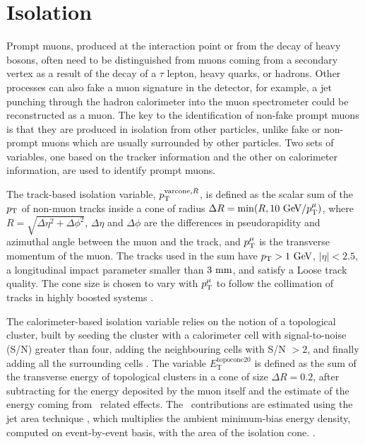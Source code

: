 \section{Isolation}

Prompt muons, produced at the interaction point or from the decay of heavy
bosons, often need to be distinguished from muons coming from a secondary
vertex as a result of the decay of a $\tau$ lepton, heavy quarks, or
hadrons. Other processes can also fake a muon signature in the detector,
for example, a jet punching through the hadron calorimeter into the muon
spectrometer could be reconstructed as a muon. The key to the identification
of non-fake prompt muons is that they are produced in isolation from
other particles, unlike fake or non-prompt muons which are usually
surrounded by other particles. Two sets of variables, one based
on the tracker information and the other on calorimeter information, are
used to identify prompt muons.

The track-based isolation variable, $p_{\text{T}}^{\text{varcone}, R}$, is defined
as the scalar sum of the $p_{\text{T}}$ of non-muon tracks inside a cone of radius
$\Delta R = \min(R, 10~\text{Ge\kern -0.1em V}/p_{\text{T}}^\mu)$, where $R = \sqrt{\Delta \eta^2 +
\Delta \phi^2}$, $\Delta \eta$ and $\Delta \phi$ are the differences
in pseudorapidity and azimuthal angle between the muon and the track, 
and $p_{\text{T}}^\mu$ is the transverse momentum of the muon.
The tracks used in the sum have $p_{\text{T}} > 1~\text{Ge\kern -0.1em V}$,
$|\eta| < 2.5$, a longitudinal impact parameter smaller than $3~\text{mm}$, and satisfy a
Loose track quality. The cone size is chosen to vary with $p_{\text{T}}^\mu$
to follow the collimation of tracks in highly boosted systems \cite{Aad:2016jkr}.

The calorimeter-based isolation variable relies on the notion of a topological
cluster, built by seeding the cluster with a calorimeter cell with
signal-to-noise (S/N) greater than four, adding the neighbouring cells with
S/N $ > 2$, and finally adding all the surrounding cells \cite{Aad:2011he}. The
variable $E_\text{T}^\text{topocone20}$ is defined as the sum of
the transverse energy of topological clusters in a cone of size $\Delta
R = 0.2$, after subtracting for the energy deposited by the muon itself
and the estimate of the energy coming from \pileup~related effects. The
\pileup~contributions are estimated using the jet area technique \cite{CACCIARI2008119},
which multiplies the ambient minimum-bias energy density, computed on
event-by-event basis, with the area of the isolation cone.
\cite{Aad:2016jkr}.

